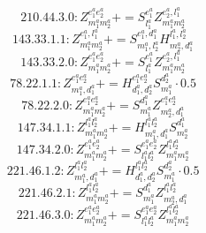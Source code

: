 \documentclass[letterpaper,10pt,fleqn,leqno,onecolumn]{article}
\begin{document}
\begin{equation} \;\;\;\;\;\;  210.44.3.0: Z^{e_{1}^{a}e_{2}^{a}}_{m_{1}^{a}m_{2}^{a}}+=S^{e_{1}^{a}}_{l_{1}^{a}}Z^{e_{2}^{a},l_{1}^{a}}_{m_{1}^{a}m_{2}^{a}} \end{equation}
\begin{equation} \;\;\;\;\;\;  143.33.1.1: Z^{e_{1}^{a},l_{1}^{a}}_{m_{1}^{a}m_{2}^{a}}+=S^{e_{1}^{a},d_{1}^{a}}_{m_{1}^{a},l_{2}^{a}}H^{l_{1}^{a},l_{2}^{a}}_{m_{2}^{a},d_{1}^{a}} \end{equation}
\begin{equation} \;\;\;\;\;\;  143.33.2.0: Z^{e_{1}^{a}e_{2}^{a}}_{m_{1}^{a}m_{2}^{a}}+=S^{e_{1}^{a}}_{l_{1}^{a}}Z^{e_{2}^{a},l_{1}^{a}}_{m_{1}^{a}m_{2}^{a}} \end{equation}
\begin{equation} \;\;\;\;\;\;  78.22.1.1: Z^{e_{1}^{a}e_{2}^{a}}_{m_{1}^{a},d_{1}^{a}}+=H^{e_{1}^{a}e_{2}^{a}}_{d_{1}^{a},d_{2}^{a}}S^{d_{2}^{a}}_{m_{1}^{a}}\cdot 0.5 \end{equation}
\begin{equation} \;\;\;\;\;\;  78.22.2.0: Z^{e_{1}^{a}e_{2}^{a}}_{m_{1}^{a}m_{2}^{a}}+=S^{d_{1}^{a}}_{m_{1}^{a}}Z^{e_{1}^{a}e_{2}^{a}}_{m_{2}^{a},d_{1}^{a}} \end{equation}
\begin{equation} \;\;\;\;\;\;  147.34.1.1: Z^{l_{1}^{a}l_{2}^{a}}_{m_{1}^{a}m_{2}^{a}}+=H^{l_{1}^{a}l_{2}^{a}}_{m_{1}^{a},d_{1}^{a}}S^{d_{1}^{a}}_{m_{2}^{a}} \end{equation}
\begin{equation} \;\;\;\;\;\;  147.34.2.0: Z^{e_{1}^{a}e_{2}^{a}}_{m_{1}^{a}m_{2}^{a}}+=S^{e_{1}^{a}e_{2}^{a}}_{l_{1}^{a}l_{2}^{a}}Z^{l_{1}^{a}l_{2}^{a}}_{m_{1}^{a}m_{2}^{a}} \end{equation}
\begin{equation} \;\;\;\;\;\;  221.46.1.2: Z^{l_{1}^{a}l_{2}^{a}}_{m_{1}^{a},d_{1}^{a}}+=H^{l_{1}^{a}l_{2}^{a}}_{d_{1}^{a},d_{2}^{a}}S^{d_{2}^{a}}_{m_{1}^{a}}\cdot 0.5 \end{equation}
\begin{equation} \;\;\;\;\;\;  221.46.2.1: Z^{l_{1}^{a}l_{2}^{a}}_{m_{1}^{a}m_{2}^{a}}+=S^{d_{1}^{a}}_{m_{1}^{a}}Z^{l_{1}^{a}l_{2}^{a}}_{m_{2}^{a},d_{1}^{a}} \end{equation}
\begin{equation} \;\;\;\;\;\;  221.46.3.0: Z^{e_{1}^{a}e_{2}^{a}}_{m_{1}^{a}m_{2}^{a}}+=S^{e_{1}^{a}e_{2}^{a}}_{l_{1}^{a}l_{2}^{a}}Z^{l_{1}^{a}l_{2}^{a}}_{m_{1}^{a}m_{2}^{a}} \end{equation}
\end{document}
